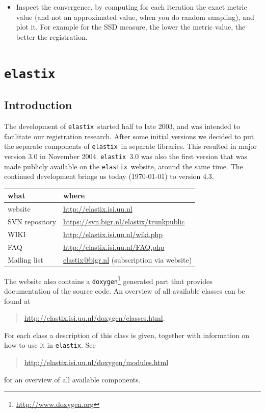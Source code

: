 \documentclass[]{report}
\newcommand{\elastix}{\texttt{elastix}}
\begin{document}
\begin{itemize}
\item Inspect the convergence, by computing for each iteration
the exact metric value (and not an approximated value, when you do
random sampling), and plot it. For example for the SSD measure,
the lower the metric value, the better the registration.

\end{itemize}




\chapter{\elastix}\label{chp:elastix}

\section{Introduction}\label{sec:elastix:intro}

The development of \elastix\ started half to late 2003, and was intended to
facilitate our registration research. After some initial versions we decided to
put the separate components of \elastix\ in separate libraries. This resulted
in major version 3.0 in November 2004. \elastix\ 3.0 was also the first version
that was made publicly available on the \elastix\ website, around the same
time. The continued development brings us today (\today) to version 4.3.

\begin{table}[h!]
\begin{tabular}{l|l}
what & where \\
\hline
website        & \url{http://elastix.isi.uu.nl} \\
SVN repository & \url{https://svn.bigr.nl/elastix/trunkpublic} \\
WIKI           & \url{http://elastix.isi.uu.nl/wiki.php} \\
FAQ            & \url{http://elastix.isi.uu.nl/FAQ.php} \\
Mailing list   & \url{elastix@bigr.nl} (subscription via website) \\
\end{tabular}
\end{table}

The website also contains a
\texttt{doxygen}\footnote{\url{http://www.doxygen.org}} generated part that
provides documentation of the source code. An overview of all available classes
can be found at
\begin{quote}
\url{http://elastix.isi.uu.nl/doxygen/classes.html}.
\end{quote}
For each class a description of this class is given, together with
information on how to use it in \elastix. See
\begin{quote}
\url{http://elastix.isi.uu.nl/doxygen/modules.html}
\end{quote}
for an overview of all available components.
\end{document}
